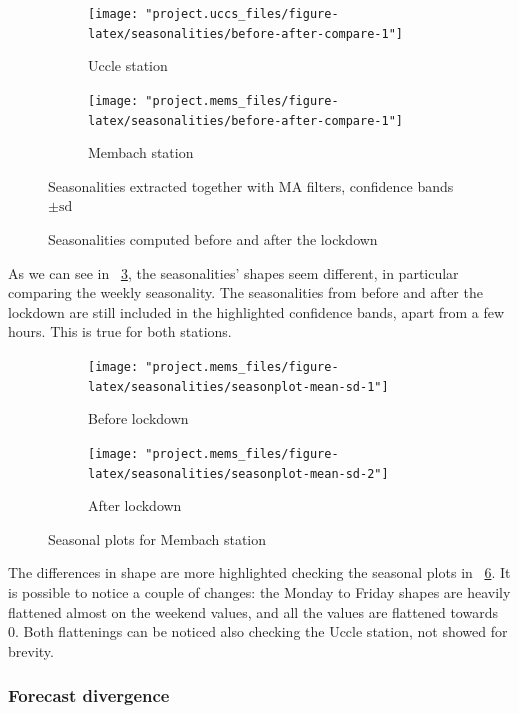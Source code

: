 \documentclass[12pt]{article}
\begin{document}
\begin{figure}[h]
	\begin{subfigure}{.5\linewidth}
		\texttt{[image: "project.uccs\_files/figure-latex/seasonalities/before-after-compare-1"]}
		\caption{Uccle station}
		\label{fig:season.lockdown:uccs}
	\end{subfigure}
	\begin{subfigure}{.5\linewidth}
		\texttt{[image: "project.mems\_files/figure-latex/seasonalities/before-after-compare-1"]}
		\caption{Membach station}
		\label{fig:season.lockdown:mems}
	\end{subfigure}
	\caption{Seasonalities computed before and after the lockdown}{\centering\small Seasonalities extracted together with MA filters, confidence bands $\pm\mathrm{sd}$\\}
	\label{fig:season.lockdown}
\end{figure}
%
As we can see in \figurename~\ref{fig:season.lockdown}, the seasonalities' shapes seem different, in particular comparing the weekly seasonality. The seasonalities from before and after the lockdown are still included in the highlighted confidence bands, apart from a few hours. This is true for both stations.

\begin{figure}[h]
	\begin{subfigure}{.5\linewidth}
		\texttt{[image: "project.mems\_files/figure-latex/seasonalities/seasonplot-mean-sd-1"]}
		\caption{Before lockdown}
		\label{fig:season.lockdown:msb:mems}
	\end{subfigure}
	\begin{subfigure}{.5\linewidth}
		\texttt{[image: "project.mems\_files/figure-latex/seasonalities/seasonplot-mean-sd-2"]}
		\caption{After lockdown}
		\label{fig:season.lockdown:msa:mems}
	\end{subfigure}
	\caption{Seasonal plots for Membach station}
	\label{fig:season.lockdown:ms:mems}
\end{figure}
%
The differences in shape are more highlighted checking the seasonal plots \cite{hyndman2018forecasting} in \figurename~\ref{fig:season.lockdown:ms:mems}. It is possible to notice a couple of changes: the Monday to Friday shapes are heavily flattened almost on the weekend values, and all the values are flattened towards 0. Both flattenings can be noticed also checking the Uccle station, not showed for brevity.

\subsubsection{Forecast divergence}
\end{document}
